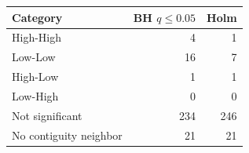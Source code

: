 \begin{tabular}{lrr}
\toprule
Category & BH $q\leq0.05$ & Holm \\
\midrule
High-High & 4 & 1 \\
Low-Low & 16 & 7 \\
High-Low & 1 & 1 \\
Low-High & 0 & 0 \\
Not significant & 234 & 246 \\
No contiguity neighbor & 21 & 21 \\
\bottomrule
\end{tabular}
